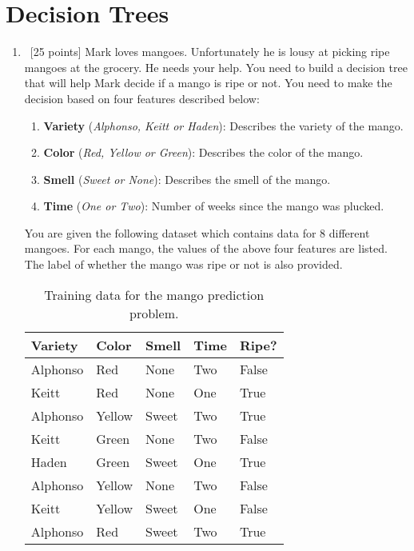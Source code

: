 \section{Decision Trees}
\label{sec:decision-trees}

\begin{enumerate}


\item~[25 points]
  Mark loves mangoes. Unfortunately he is lousy at picking ripe mangoes at the grocery. He needs your help.
  You need to build a decision tree that will help Mark decide if a mango is ripe or not. You need to make the decision based on
  four features described below:
  \begin{enumerate}
  \item\textbf{Variety} (\textit{Alphonso, Keitt or Haden}): Describes the variety of the mango.
  \item\textbf{Color} (\textit{Red, Yellow or Green}): Describes the color of the mango.
  \item\textbf{Smell} (\textit{Sweet or None}): Describes the smell of the mango.
  \item\textbf{Time} (\textit{One or Two}): Number of weeks since the mango was plucked.
  \end{enumerate}

  You are given the following dataset which contains data for 8 different mangoes. For each mango, the values of the above four features
  are listed. The label of whether the mango was ripe or not is also provided.

  \begin{table}[h]
    \centering
    \begin{tabular}{llll|l}
      \hline
      Variety & Color    & Smell  & Time & Ripe?  \\ \hline
      Alphonso& Red      & None   & Two  & False  \\
      Keitt   & Red      & None   & One  & True   \\
      Alphonso& Yellow   & Sweet  & Two  & True   \\
      Keitt   & Green    & None   & Two  & False  \\
      Haden   & Green    & Sweet  & One  & True   \\
      Alphonso& Yellow   & None   & Two  & False  \\
      Keitt   & Yellow   & Sweet  & One  & False  \\
      Alphonso& Red      & Sweet  & Two  & True   \\ \hline
    \end{tabular}
    \caption{Training data for the mango prediction problem.}\label{tb-mango-train}
  \end{table}



\end{enumerate}
